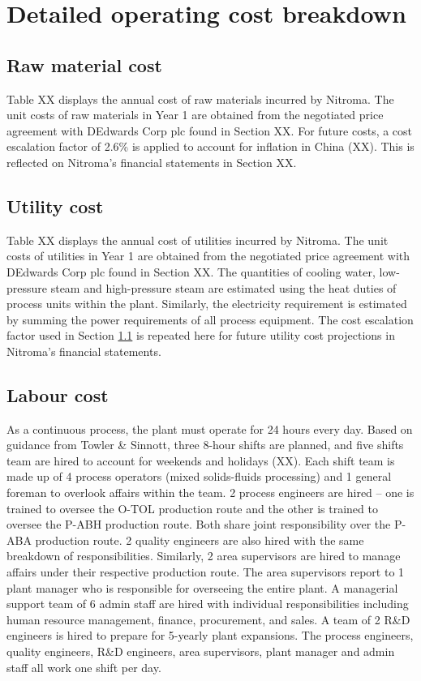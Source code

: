 \section{Detailed operating cost breakdown}
\subsection{Raw material cost}
\label{sec:opex-raw-material}
Table XX displays the annual cost of raw materials incurred by Nitroma. The unit costs of raw materials in Year 1 are obtained from the negotiated price agreement with DEdwards Corp plc found in Section XX. For future costs, a cost escalation factor of 2.6\% is applied to account for inflation in China (XX). This is reflected on Nitroma’s financial statements in Section XX.

\subsection{Utility cost}
Table XX displays the annual cost of utilities incurred by Nitroma. The unit costs of utilities in Year 1 are obtained from the negotiated price agreement with DEdwards Corp plc found in Section XX. The quantities of cooling water, low-pressure steam and high-pressure steam are estimated using the heat duties of process units within the plant. Similarly, the electricity requirement is estimated by summing the power requirements of all process equipment. The cost escalation factor used in Section \ref{sec:opex-raw-material} is repeated here for future utility cost projections in Nitroma’s financial statements.  

\subsection{Labour cost}
As a continuous process, the plant must operate for 24 hours every day. Based on guidance from Towler \& Sinnott, three 8-hour shifts are planned, and five shifts team are hired to account for weekends and holidays (XX). Each shift team is made up of 4 process operators (mixed solids-fluids processing) and 1 general foreman to overlook affairs within the team. 2 process engineers are hired – one is trained to oversee the O-TOL production route and the other is trained to oversee the P-ABH production route. Both share joint responsibility over the P-ABA production route. 2 quality engineers are also hired with the same breakdown of responsibilities.  Similarly, 2 area supervisors are hired to manage affairs under their respective production route. The area supervisors report to 1 plant manager who is responsible for overseeing the entire plant. A managerial support team of 6 admin staff are hired with individual responsibilities including human resource management, finance, procurement, and sales. A team of 2 R&D engineers is hired to prepare for 5-yearly plant expansions. The process engineers, quality engineers, R\&D engineers, area supervisors, plant manager and admin staff all work one shift per day.

